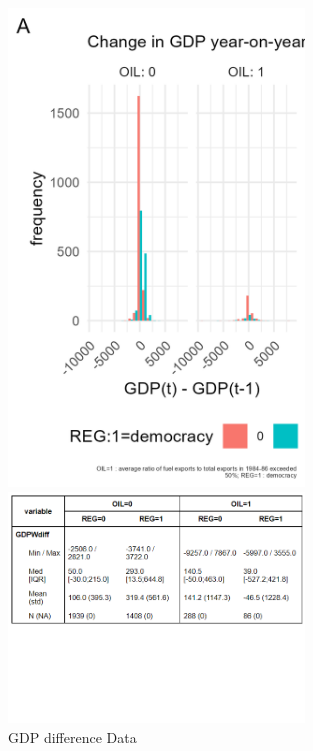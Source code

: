 \documentclass[12pt,letterpaper]{article}
\begin{document}
  \begin{figure}[!htbp]
	  \includegraphics[width=0.7\textwidth]{graphics/gdp_hist.png}

	  \includegraphics[width=0.7\textwidth]{graphics/gdp_flextab.png}
	  \caption{GDP difference Data}
	  \label{fig:gdp}
	\end{figure}
	\clearpage
\end{document}
